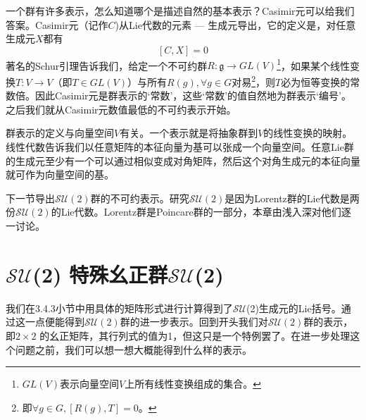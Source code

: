 一个群有许多表示，怎么知道哪个是描述自然的基本表示？Casimir元可以给我们答案。Casimir元（记作$C$)从Lie代数的元素 --- 生成元导出，它的定义是，对任意生成元$X$都有
\begin{equation}
\label{equ3.93}
[C, X] = 0
\end{equation}
著名的Schur引理告诉我们，给定一个不可约群$R: \mathfrak{g} \rightarrow GL(V)$\footnote{$GL(V)$表示向量空间$V$上所有线性变换组成的集合。}，如果某个线性变换$T: V \rightarrow V$（即$T \in GL(V)$）与所有$R(g), \forall g \in G$对易\footnote{即$\forall g \in G, [R(g), T] = 0$。}，则$T$必为恒等变换的常数倍。因此Casimir元是群表示的‘常数’，这些‘常数’的值自然地为群表示‘编号’。之后我们就从Casimir元数值最低的不可约表示开始。

群表示的定义与向量空间$V$有关。一个表示就是将抽象群到$V$的线性变换的映射。线性代数告诉我们以任意矩阵的本征向量为基可以张成一个向量空间。任意Lie群的生成元至少有一个可以通过相似变成对角矩阵，然后这个对角生成元的本征向量就可作为向量空间的基。

下一节导出$\mathcal{SU}(2)$群的不可约表示。研究$\mathcal{SU}(2)$是因为Lorentz群的Lie代数是两份$\mathcal{SU}(2)$的Lie代数。Lorentz群是Poincare群的一部分，本章由浅入深对他们逐一讨论。




\section[$\mathcal{SU}$(2)]{$\mathcal{SU}$(2)  特殊幺正群$\mathcal{SU}$(2)}\label{sec3.6}

我们在3.4.3小节中用具体的矩阵形式进行计算得到了$\mathcal{SU}$(2)生成元的Lie括号。通过这一点便能得到$\mathcal{SU}(2)$群的进一步表示。回到开头我们对$\mathcal{SU}(2)$群的表示，即$2\times 2$ 的幺正矩阵，其行列式的值为1，但这只是一个特例罢了。在进一步处理这个问题之前，我们可以想一想大概能得到什么样的表示。

